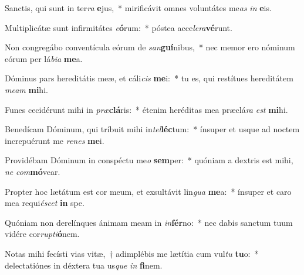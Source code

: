 \item Sanctis, qui sunt in ter\textit{ra} \textbf{e}jus,~* mirificávit omnes voluntátes me\textit{as} \textit{in} \textbf{e}is.
\item Multiplicátæ sunt infirmitátes \textit{e}\textbf{ó}rum:~* póstea acce\textit{le}\textit{ra}\textbf{vé}runt.
\item Non congregábo conventícula eórum de \textit{san}\textbf{guí}nibus,~* nec memor ero nóminum eórum per lá\textit{bi}\textit{a} \textbf{me}a.
\item Dóminus pars hereditátis meæ, et cáli\textit{cis} \textbf{me}i:~* tu es, qui restítues hereditátem \textit{me}\textit{am} \textbf{mi}hi.
\item Funes cecidérunt mihi in \textit{præ}\textbf{clá}ris:~* étenim heréditas mea præclá\textit{ra} \textit{est} \textbf{mi}hi.
\item Benedícam Dóminum, qui tríbuit mihi in\textit{tel}\textbf{léc}tum:~* ínsuper et usque ad noctem increpuérunt me \textit{re}\textit{nes} \textbf{me}i.
\item Providébam Dóminum in conspéctu me\textit{o} \textbf{sem}per:~* quóniam a dextris est mihi, \textit{ne} \textit{com}\textbf{mó}vear.
\item Propter hoc lætátum est cor meum, et exsultávit lin\textit{gua} \textbf{me}a:~* ínsuper et caro mea requi\textit{é}\textit{scet} \textbf{in} spe.
\item Quóniam non derelínques ánimam meam in \textit{in}\textbf{fér}no:~* nec dabis sanctum tuum vidére cor\textit{rup}\textit{ti}\textbf{ó}nem.
\item Notas mihi fecísti vias vitæ,~† adimplébis me lætítia cum vul\textit{tu} \textbf{tu}o:~* delectatiónes in déxtera tua us\textit{que} \textit{in} \textbf{fi}nem.
